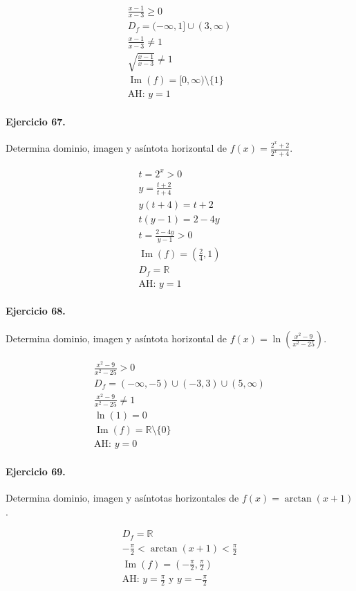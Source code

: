 \documentclass[11pt,a4paper]{article}
\begin{document}
\[
\begin{aligned}
\frac{x-1}{x-3}\ge0\\
D_f=(-\infty,1]\cup(3,\infty)\\
\frac{x-1}{x-3}\ne1\\
\sqrt{\frac{x-1}{x-3}}\ne1\\
\operatorname{Im}(f)=[0,\infty)\setminus\{1\}\\
\text{AH: }y=1
\end{aligned}
\]


\paragraph{Ejercicio 67.} Determina dominio, imagen y asíntota horizontal de $f(x)=\frac{2^x+2}{2^x+4}$. 

\[
\begin{aligned}
t=2^x>0\\
y=\frac{t+2}{t+4}\\
y(t+4)=t+2\\
t(y-1)=2-4y\\
t=\frac{2-4y}{y-1}>0\\
\operatorname{Im}(f)=(\frac{2}{4},1)\\
D_f=\mathbb{R}\\
\text{{AH: }}y=1
\end{aligned}
\]


\paragraph{Ejercicio 68.} Determina dominio, imagen y asíntota horizontal de $f(x)=\ln\left(\frac{x^2-9}{x^2-25}\right)$.

\[
\begin{aligned}
\frac{x^2-9}{x^2-25} >0\\
D_f=(-\infty,-5)\cup(-3,3)\cup(5,\infty)\\
\frac{x^2-9}{x^2-25}\ne1\\
\ln(1)=0\\
\operatorname{Im}(f)=\mathbb{R}\setminus\{0\}\\
\text{{AH: }}y=0
\end{aligned}
\]


\paragraph{Ejercicio 69.} Determina dominio, imagen y asíntotas horizontales de $f(x)=\arctan(x+1)$.

\[
\begin{aligned}
D_f=\mathbb{R}\\
-\frac{\pi}{2}<\arctan(x+1)<\frac{\pi}{2}\\
\operatorname{Im}(f)=\left(-\frac{\pi}{2},\frac{\pi}{2}\right)\\
\text{AH: }y=\frac{\pi}{2}\text{ y }y=-\frac{\pi}{2}
\end{aligned}
\]
\end{document}
